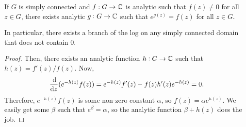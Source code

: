 		\begin{corollary}
			If $G$ is simply connected and $f : G \to \mathbb{C}$ is analytic such that $f(z) \ne 0$ for all $z \in G$, there exists analytic $g : G \to \mathbb{C}$ such that $e^{g(z)} = f(z)$ for all $z \in G$.
		\end{corollary}

		In particular, there exists a branch of the log on any simply connected domain that does not contain $0$.

		\begin{proof}
			Then, there exists an analytic function $h : G \to \mathbb{C}$ such that $h(z) = f'(z) / f(z)$. Now,
			\[ \frac{\dif}{\dif z} (e^{-h(z)} f(z)) = e^{-h(z)} f'(z) - f(z) h'(z) e^{-h(z)} = 0. \]
			Therefore, $e^{-h(z)} f(z)$ is some non-zero constant $\alpha$, so $f(z) = \alpha e^{h(z)}$. We easily get some $\beta$ such that $e^{\beta} = \alpha$, so the analytic function $\beta + h(z)$ does the job.
		\end{proof}